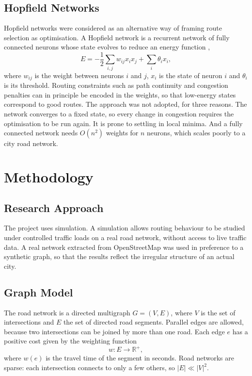 \documentclass[12pt]{report}
\begin{document}
\section{Hopfield Networks}

Hopfield networks were considered as an alternative way of framing route selection as optimisation. A Hopfield network is a recurrent network of fully connected neurons whose state evolves to reduce an energy function \citep{hopfield1982},
\begin{equation}
E = -\frac{1}{2}\sum_{i,j} w_{ij} x_i x_j + \sum_{i} \theta_i x_i,
\end{equation}
where $w_{ij}$ is the weight between neurons $i$ and $j$, $x_i$ is the state of neuron $i$ and $\theta_i$ is its threshold. Routing constraints such as path continuity and congestion penalties can in principle be encoded in the weights, so that low-energy states correspond to good routes. The approach was not adopted, for three reasons. The network converges to a fixed state, so every change in congestion requires the optimisation to be run again. It is prone to settling in local minima. And a fully connected network needs $O(n^2)$ weights for $n$ neurons, which scales poorly to a city road network.


\chapter{Methodology}
\label{ch:method}

\section{Research Approach}

The project uses simulation. A simulation allows routing behaviour to be studied under controlled traffic loads on a real road network, without access to live traffic data. A real network extracted from OpenStreetMap was used in preference to a synthetic graph, so that the results reflect the irregular structure of an actual city.

\section{Graph Model}

The road network is a directed multigraph $G = (V, E)$, where $V$ is the set of intersections and $E$ the set of directed road segments. Parallel edges are allowed, because two intersections can be joined by more than one road. Each edge $e$ has a positive cost given by the weighting function
\begin{equation}
w : E \rightarrow \mathbb{R}^{+},
\end{equation}
where $w(e)$ is the travel time of the segment in seconds. Road networks are sparse: each intersection connects to only a few others, so $|E| \ll |V|^2$.
\end{document}
